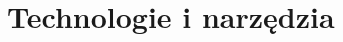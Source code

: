 \documentclass[12pt]{report}
\begin{document}

	


\chapter{Technologie i narzędzia}
\end{document}
